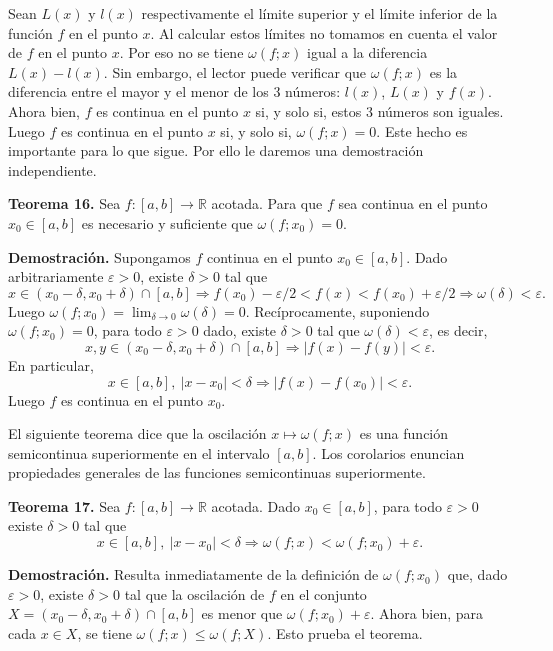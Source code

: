 \documentclass[12pt,oneside]{book}
\begin{document}
Sean \(L(x)\) y \(l(x)\) respectivamente el límite superior y el límite inferior de la función \(f\) en el punto \(x\). Al calcular estos límites no tomamos en cuenta el valor de \(f\) en el punto \(x\). Por eso no se tiene \(\omega(f; x)\) igual a la diferencia \(L(x) - l(x)\). Sin embargo, el lector puede verificar que \(\omega(f; x)\) es la diferencia entre el mayor y el menor de los 3 números: \(l(x)\), \(L(x)\) y \(f(x)\). Ahora bien, \(f\) es continua en el punto \(x\) si, y solo si, estos 3 números son iguales. Luego \(f\) es continua en el punto \(x\) si, y solo si, \(\omega(f; x) = 0\). Este hecho es importante para lo que sigue. Por ello le daremos una demostración independiente.

\textbf{Teorema 16.} Sea \(f: [a, b] \to \mathbb{R}\) acotada. Para que \(f\) sea continua en el punto \(x_0 \in [a, b]\) es necesario y suficiente que \(\omega(f; x_0) = 0\).

\textbf{Demostración.} Supongamos \(f\) continua en el punto \(x_0 \in [a, b]\). Dado arbitrariamente \(\varepsilon > 0\), existe \(\delta > 0\) tal que
\[
x \in (x_0 - \delta, x_0 + \delta) \cap [a, b] \Rightarrow f(x_0) - \varepsilon/2 < f(x) < f(x_0) + \varepsilon/2 \Rightarrow \omega(\delta) < \varepsilon.
\]
Luego \(\omega(f; x_0) = \lim_{\delta \to 0} \omega(\delta) = 0\). Recíprocamente, suponiendo \(\omega(f; x_0) = 0\), para todo \(\varepsilon > 0\) dado, existe \(\delta > 0\) tal que \(\omega(\delta) < \varepsilon\), es decir,
\[
x, y \in (x_0 - \delta, x_0 + \delta) \cap [a, b] \Rightarrow |f(x) - f(y)| < \varepsilon.
\]
En particular,
\[
x \in [a, b],\ |x - x_0| < \delta \Rightarrow |f(x) - f(x_0)| < \varepsilon.
\]
Luego \(f\) es continua en el punto \(x_0\).

El siguiente teorema dice que la oscilación \(x \mapsto \omega(f; x)\) es una función semicontinua superiormente en el intervalo \([a, b]\). Los corolarios enuncian propiedades generales de las funciones semicontinuas superiormente.

\textbf{Teorema 17.} Sea \(f: [a, b] \to \mathbb{R}\) acotada. Dado \(x_0 \in [a, b]\), para todo \(\varepsilon > 0\) existe \(\delta > 0\) tal que
\[
x \in [a, b],\ |x - x_0| < \delta \Rightarrow \omega(f; x) < \omega(f; x_0) + \varepsilon.
\]

\textbf{Demostración.} Resulta inmediatamente de la definición de \(\omega(f; x_0)\) que, dado \(\varepsilon > 0\), existe \(\delta > 0\) tal que la oscilación de \(f\) en el conjunto \(X = (x_0 - \delta, x_0 + \delta) \cap [a, b]\) es menor que \(\omega(f; x_0) + \varepsilon\). Ahora bien, para cada \(x \in X\), se tiene \(\omega(f; x) \leq \omega(f; X)\). Esto prueba el teorema.
\end{document}
